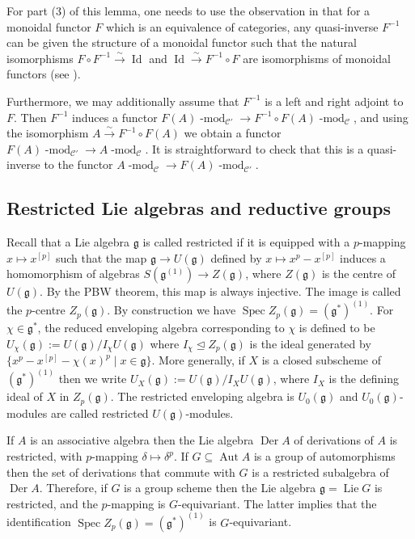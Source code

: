\documentclass[twoside,12pt,reqno]{amsart}
\theoremstyle{remark}
\numberwithin{equation}{section}
\def\isoto{\overset{\sim}{\longrightarrow}}
\def\lmod{\!\operatorname{-mod}}
\def\Lie{\operatorname{Lie}}
\def\Der{\operatorname{Der}}
\def\Spec{\operatorname{Spec}}
\def\Id{\operatorname{Id}}
\def\Aut{\operatorname{Aut}}
\def\g{{\mathfrak g}}
\def\cC{\mathcal{C}}
\begin{document}
 For part (3) of this lemma, one needs to use the observation in \cite[Remark 2.4.10]{EGNO} that for a monoidal functor $F$ which is an equivalence of categories, any quasi-inverse $F^{-1}$ can be given the structure of a monoidal functor such that the natural isomorphisms $F\circ F^{-1}\isoto \Id$ and $\Id\isoto F^{-1} \circ F$ are isomorphisms of monoidal functors (see \cite[Definition 2.4.8]{EGNO}).
 
 Furthermore, we may additionally assume that $F^{-1}$ is a left and right adjoint to $F$. Then $F^{-1}$ induces a functor $F(A)\lmod_{\cC'}\to F^{-1} \circ F(A)\lmod_{\cC}$, and using the isomorphism $A\isoto F^{-1}\circ F(A)$ we obtain a functor $F(A)\lmod_{\cC'}\to A\lmod_{\cC}$. It is straightforward to check that this is a quasi-inverse to the functor $A\lmod_{\cC}\to F(A)\lmod_{\cC'}$.


\subsection{Restricted Lie algebras and reductive groups}
\label{ss:reductivegroupsandLiealgebras}

Recall that a Lie algebra $\g$ is called restricted if it is equipped with a $p$-mapping $x \mapsto x^{[p]}$ such that the map $\g \to U(\g)$ defined by $x\mapsto  x^p - x^{[p]}$ induces a homomorphism of algebras $S(\g^{(1)}) \to Z(\g)$, where $Z(\g)$ is the centre of $U(\g)$. By the PBW theorem, this map is always injective. The image is called the $p$-centre $Z_p(\g)$. By construction we have $\Spec Z_p(\g) = (\g^*)^{(1)}$. For $\chi\in\g^*$, the reduced enveloping algebra corresponding to $\chi$ is defined to be $U_\chi(\g):=U(\g)/I_\chi U(\g)$ where $I_\chi \unlhd Z_p(\g)$ is the ideal generated by $\{ x^p-x^{[p]}-\chi(x)^p\mid x\in\g\}$. More generally, if $X$ is a closed subscheme of $(\g^*)^{(1)}$ then we write $U_X(\g):=U(\g)/I_X U(\g)$, where $I_X$ is the defining ideal of $X$ in $Z_p(\g)$. The restricted enveloping algebra is $U_0(\g)$ and $U_0(\g)$-modules are called restricted $U(\g)$-modules.


If $A$ is an associative algebra then the Lie algebra $\Der A$ of derivations of $A$ is restricted, with $p$-mapping $\delta \mapsto \delta^p$. If $G \subseteq \Aut A$ is a group of automorphisms then the set of derivations that commute with $G$ is a restricted subalgebra of $\Der A$. Therefore, if $G$ is a group scheme then the Lie algebra $\g = \Lie G$ is restricted, and the $p$-mapping is $G$-equivariant. The latter implies that the identification $\Spec Z_p(\g) = (\g^*)^{(1)}$ is $G$-equivariant.
\end{document}
